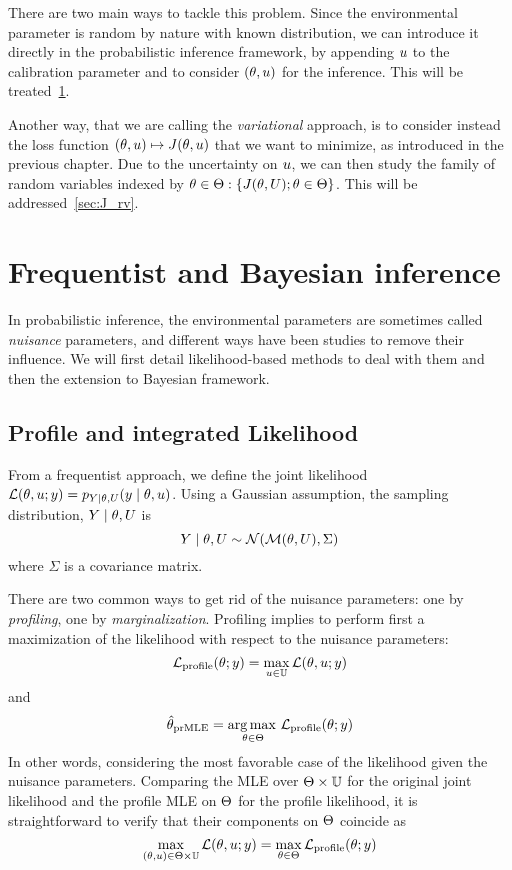 \documentclass[../../Main_ManuscritThese.tex]{subfiles}
\begin{document}
There are two main ways to tackle this problem. Since the environmental parameter is random by nature with known distribution, we can introduce it directly in the probabilistic inference framework, by appending $u$ to the calibration parameter and to consider $(\theta, u)$ for the inference. This will be treated~\cref{sec:nuisance_parameters}.

Another way, that we are calling the \emph{variational} approach, is to consider instead the loss function $(\theta, u) \mapsto J(\theta, u)$ that we want to minimize, as introduced in the previous chapter. Due to the uncertainty on $u$, we can then study the family of random variables indexed by $\theta \in \Theta: \{J(\theta, U); \theta\in\Theta\}$. This will be addressed~\cref{sec:J_rv}.

\section{Frequentist and Bayesian inference}
\label{sec:nuisance_parameters}
In probabilistic inference, the environmental parameters are sometimes called \emph{nuisance} parameters, and different ways have been studies to remove their influence.
We will first detail likelihood-based methods to deal with them and then the extension to Bayesian framework.
\subsection{Profile and integrated Likelihood}
From a frequentist approach, we define the joint likelihood $\mathcal{L}(\theta, u ;y) = p_{Y\mid \theta,U}(y \mid \theta, u)$.
Using a Gaussian assumption, the sampling distribution, $Y\mid \theta, U$ is 
\begin{equation}
Y \mid \theta, U \sim \mathcal{N}(\mathcal{M}(\theta, U), \Sigma)
\end{equation}
where $\Sigma$ is a covariance matrix.

There are two common ways to get rid of the nuisance parameters: one by \emph{profiling}, one by \emph{marginalization}.
Profiling implies to perform first a maximization of the likelihood with respect to the nuisance parameters:
\begin{equation}
  \label{eq:eq:def_profile_lik}
  \mathcal{L}_{\mathrm{profile}}(\theta;y) = \max_{u \in \mathbb{U}} \mathcal{L}(\theta,u;y)
\end{equation}
and
\begin{equation}
  \hat{\theta}_{\mathrm{prMLE}} = \operatorname*{arg\,max \,}_{\theta\in\Theta} \mathcal{L}_{\mathrm{profile}}(\theta;y)
\end{equation}
In other words, considering the most favorable case of the likelihood given the nuisance parameters.
Comparing the MLE over $\Theta \times \mathbb{U}$ for the original joint likelihood and the profile MLE on $\Theta$ for the profile likelihood, it is straightforward to verify that their components on $\Theta$ coincide as
\begin{equation}
  \max_{(\theta ,u) \in \Theta\times \mathbb{U}} \mathcal{L}(\theta,u;y) = \max_{\theta\in \Theta} \mathcal{L}_{\mathrm{profile}}(\theta;y)
\end{equation}
\end{document}
